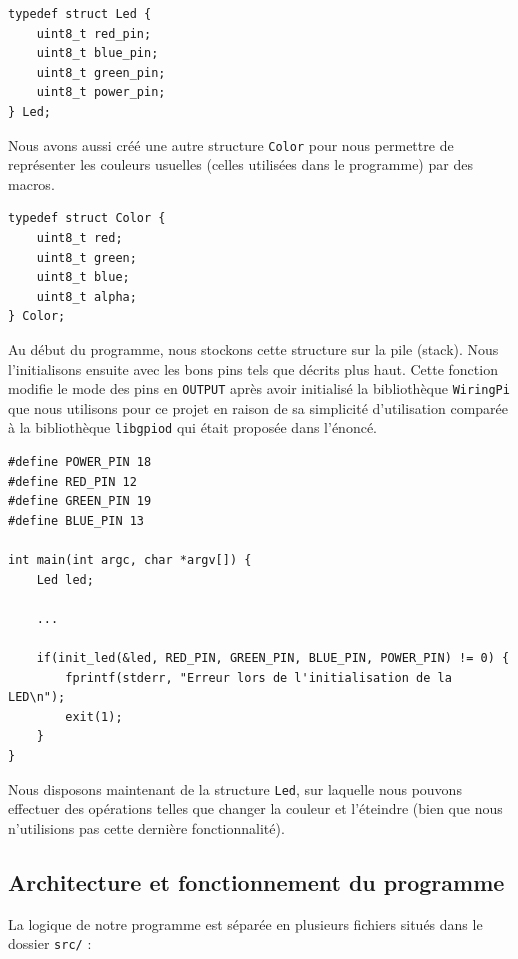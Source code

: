 \documentclass[a4paper,11pt]{article}
\begin{document}
\begin{verbatim}
typedef struct Led {
    uint8_t red_pin;
    uint8_t blue_pin;
    uint8_t green_pin;
    uint8_t power_pin;
} Led;
\end{verbatim}

Nous avons aussi créé une autre structure \texttt{Color} pour nous permettre de représenter les couleurs usuelles (celles utilisées dans le programme) par des macros.

\begin{verbatim}
typedef struct Color {
    uint8_t red;
    uint8_t green;
    uint8_t blue;
    uint8_t alpha;
} Color;
\end{verbatim}

Au début du programme, nous stockons cette structure sur la pile (stack). Nous l'initialisons ensuite avec les bons pins tels que décrits plus haut. Cette fonction modifie le mode des pins en \texttt{OUTPUT} après avoir initialisé la bibliothèque \texttt{WiringPi} que nous utilisons pour ce projet en raison de sa simplicité d'utilisation comparée à la bibliothèque \texttt{libgpiod} qui était proposée dans l'énoncé.

\begin{verbatim}
#define POWER_PIN 18
#define RED_PIN 12
#define GREEN_PIN 19
#define BLUE_PIN 13

int main(int argc, char *argv[]) {
    Led led;
    
    ...
    
    if(init_led(&led, RED_PIN, GREEN_PIN, BLUE_PIN, POWER_PIN) != 0) {
        fprintf(stderr, "Erreur lors de l'initialisation de la LED\n");
        exit(1);
    }
}
\end{verbatim}

Nous disposons maintenant de la structure \texttt{Led}, sur laquelle nous pouvons effectuer des opérations telles que changer la couleur et l'éteindre (bien que nous n'utilisions pas cette dernière fonctionnalité).

\subsection{Architecture et fonctionnement du programme}

La logique de notre programme est séparée en plusieurs fichiers situés dans le dossier \texttt{src/} :
\end{document}
